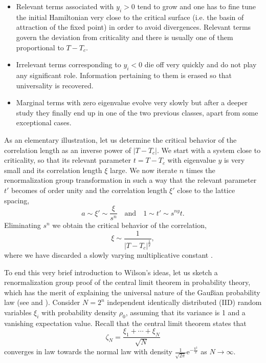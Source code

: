 \documentclass[12pt,here,feynmf]{article}
\begin{document}
\begin{itemize}
\item
Relevant terms associated with 
$y_i>0$ tend to grow and one has to fine tune the initial Hamiltonian very close to the critical surface (i.e. the basin of attraction of the fixed point) in order to avoid divergences. Relevant terms govern the deviation from criticality and there is usually one of them proportional to $T-T_{c}$.

\item
Irrelevant terms corresponding to $y_{i}<0$ die off very quickly and do not play any significant role.  Information pertaining to them is erased so that universality is recovered.
\item
Marginal terms with zero eigenvalue evolve very slowly but after a deeper study they finally end up in one of the two previous classes, apart from some exceptional cases.
\end{itemize}   

As an elementary illustration, let us determine the critical behavior of the correlation length as an inverse power of $|T-T_{c}|$. We start with a system close to criticality, so that its relevant parameter $t=T-T_{c}$ with eigenvalue $y$ is very small and its correlation length $\xi$ large. We now iterate $n$ times the renormalization group transformation in such a way that the relevant parameter $t'$ becomes of order unity and the correlation length $\xi'$ close to the lattice spacing,
\begin{equation}
a\sim\xi'\sim\frac{\xi}{s^{n}}\quad\mathrm{and}\quad1\sim t'\sim s^{ny}t.
\end{equation}
Eliminating $s^{n}$ we obtain the critical behavior of the correlation, 
\begin{equation}
\xi\sim\frac{1}{|T-T_{c}|^{\frac{1}{y}}},
\end{equation}
where we have discarded a slowly varying  multiplicative constant . 


To end this very brief introduction to Wilson's ideas, let us sketch a renormalization group proof of the central limit theorem in probability theory, which has the merit of explaining the universal nature of the Gau\ss ian probability law (see \cite{sinai} and \cite{jona}). Consider $N=2^{n}$ independent identically distributed (IID) random variables $\xi_{i}$ with probability density $\rho_{0}$, assuming that its variance is 1 and a vanishing expectation value. Recall that the central limit theorem states that  
\begin{equation}
\zeta_{N}=\frac{\xi_{1}+\cdots+\xi_{N}}{\sqrt{N}}
\end{equation}
converges in law towards the normal law with density $\frac{1}{\sqrt{2\pi}}\mathrm{e^{-\frac{x^{2}}{2}}}$ as $N\rightarrow\infty$.
 
\end{document}
